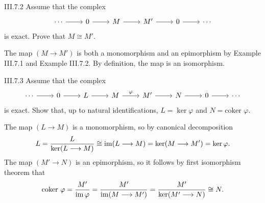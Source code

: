 \begin{problem}{III.7.2}
Assume that the complex
\[
\begin{tikzcd}
\cdots \arrow[r] &0 \arrow[r] &M \arrow[r] &M' \arrow[r] &0 \arrow[r] &\cdots 
\end{tikzcd}
\]
is exact. Prove that $M \cong M'$.
\end{problem}
\begin{pf}
The map $(M \longrightarrow M')$ is both a monomorphism and an epimorphism by Example III.7.1 and Example III.7.2. By definition, the map is an isomorphism. 
\end{pf}

\begin{problem}{III.7.3}
Assume that the complex
\[
\begin{tikzcd}
\cdots \arrow[r] & 0 \arrow[r] & L \arrow[r] & M \arrow[r, "\varphi"] & M' \arrow[r] & N \arrow[r] & 0 \arrow[r] & \cdots
\end{tikzcd}	
\]
is exact. Show that, up to natural identifications, $L = \ker \varphi$ and $N = \text{coker }\varphi$.
\end{problem}
\begin{pf}
The map $(L \longrightarrow M)$ is a monomorphism, so by canonical decomposition 
\[
L = \frac{L}{\ker (L \longrightarrow M)} \cong \operatorname{im}(L \longrightarrow M) = \ker (M \longrightarrow M') = \ker \varphi.
\]
The map $(M' \longrightarrow N)$ is an epimorphism, so it follows by first isomorphism theorem that
\[
\text{coker }\varphi=\frac{M'}{\operatorname{im} \varphi}=\frac{M'}{\operatorname{im}(M \longrightarrow M')}= \frac{M'}{\ker(M' \longrightarrow N)} \cong N.
\]
\end{pf}

